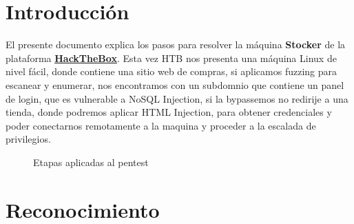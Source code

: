 \documentclass[a4paper]{article} %
\newcommand{\machineName}{Stocker} %
\begin{document}
    
\cfoot{\thepage} %

\begin{titlepage}


\end{titlepage}


\clearpage

\tableofcontents

\clearpage


\section{Introducción}
    El presente documento explica los pasos para resolver la máquina {\textbf{\machineName}} de la plataforma \href{https://hackthebox.com}{\textbf{\color{blue}HackTheBox}}.
    Esta vez HTB nos presenta una máquina Linux de nivel fácil, donde contiene una sitio web de compras, si aplicamos fuzzing para escanear y enumerar, nos encontramos con un subdomnio que contiene un panel de login, que  es vulnerable a NoSQL Injection, si la bypassemos no redirije a una tienda, donde podremos aplicar HTML Injection, para obtener  credenciales y poder conectarnos remotamente a la maquina y proceder a la escalada de privilegios.
    
    \vspace{0.5cm}
    
    \begin{figure}[h] %
        \begin{center} %
        \end{center}
        \caption{Etapas aplicadas al pentest}   
    \end{figure}

\section{Reconocimiento}
    
\end{document}
